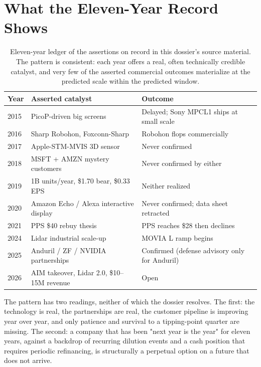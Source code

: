 \documentclass[10pt,letterpaper,twocolumn]{article}
\begin{document}
\section{What the Eleven-Year Record Shows}

\begin{table}[h]
\footnotesize
\centering
\setlength{\tabcolsep}{3pt}
\begin{tabularx}{\columnwidth}{lXX}
\toprule
\textbf{Year} & \textbf{Asserted catalyst} & \textbf{Outcome} \\
\midrule
2015 & PicoP-driven big screens & Delayed; Sony MPCL1 ships at small scale \\
2016 & Sharp Robohon, Foxconn-Sharp & Robohon flops commercially \\
2017 & Apple-STM-MVIS 3D sensor & Never confirmed \\
2018 & MSFT + AMZN mystery customers & Never confirmed by either \\
2019 & 1B units/year, \$1.70 bear, \$0.33 EPS & Neither realized \\
2020 & Amazon Echo / Alexa interactive display & Never confirmed; data sheet retracted \\
2021 & PPS \$40 rebuy thesis & PPS reaches \$28 then declines \\
2024 & Lidar industrial scale-up & MOVIA L ramp begins \\
2025 & Anduril / ZF / NVIDIA partnerships & Confirmed (defense advisory only for Anduril) \\
2026 & AIM takeover, Lidar 2.0, \$10--15M revenue & Open \\
\bottomrule
\end{tabularx}
\caption{Eleven-year ledger of the assertions on record in this dossier's source material. The pattern is consistent: each year offers a real, often technically credible catalyst, and very few of the asserted commercial outcomes materialize at the predicted scale within the predicted window.}
\label{tab:ledger}
\end{table}

The pattern has two readings, neither of which the dossier resolves. The first: the technology is real, the partnerships are real, the customer pipeline is improving year over year, and only patience and survival to a tipping-point quarter are missing. The second: a company that has been "next year is the year" for eleven years, against a backdrop of recurring dilution events and a cash position that requires periodic refinancing, is structurally a perpetual option on a future that does not arrive.
\end{document}
